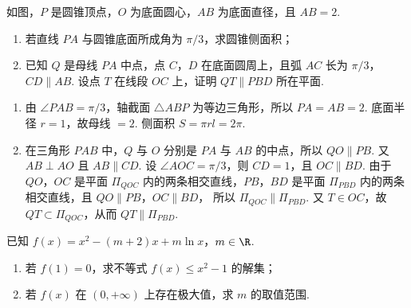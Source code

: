 \begin{problem}
如图，\(P\) 是圆锥顶点，\(O\) 为底面圆心，\(AB\) 为底面直径，且 \(AB=2\).
\begin{enumerate}
\item 若直线 \(PA\) 与圆锥底面所成角为 \(\pi/3\)，求圆锥侧面积；
\item 已知 \(Q\) 是母线 \(PA\) 中点，点 \(C\)，\(D\) 在底面圆周上，且弧 \(AC\) 长为 \(\pi/3\)，\(CD\parallel AB\). 设点 \(T\) 在线段 \(OC\) 上，证明 \(QT\parallel PBD\) 所在平面.
\end{enumerate}

\end{problem}

\begin{solution}
\begin{enumerate}
\item 由 \(\angle PAB=\pi/3\)，轴截面 \(\triangle ABP\) 为等边三角形，所以 \(PA=AB=2\). 底面半径 \(r=1\)，故母线 \(=2\). 侧面积 \(S=\pi r l=2\pi\).

\item 在三角形 \(PAB\) 中，\(Q\) 与 \(O\) 分别是 \(PA\) 与 \(AB\) 的中点，所以
\(QO\parallel PB\).
又 \(AB\perp AO\) 且 \(AB\parallel CD\). 设 \(\angle AOC=\pi/3\)，则 \(CD=1\)，且
\(OC\parallel BD\).
由于 \(QO\)，\(OC\) 是平面 \(\Pi_{QOC}\) 内的两条相交直线，\(PB\)，\(BD\) 是平面 \(\Pi_{PBD}\) 内的两条相交直线，且
\(QO\parallel PB\)，\(OC\parallel BD\)，
所以
\(\Pi_{QOC}\parallel\Pi_{PBD}\).
又 \(T\in OC\)，故 \(QT\subset\Pi_{QOC}\)，从而
\(QT\parallel\Pi_{PBD}\).
\end{enumerate}
\end{solution}

\begin{problem}
已知 \(f(x)=x^2-(m+2)x+m\ln x\)，\(m\in\R\).
\begin{enumerate}
\item 若 \(f(1)=0\)，求不等式 \(f(x)\le x^2-1\) 的解集；
\item 若 \(f(x)\) 在 \((0,+\infty)\) 上存在极大值，求 \(m\) 的取值范围.
\end{enumerate}
\end{problem}

